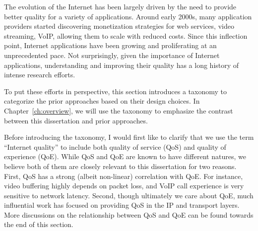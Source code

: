 The evolution of the Internet has been largely driven by the need
to provide better quality for a variety of applications.
Around early 2000s, many application 
providers started discovering monetization strategies for web services, 
video streaming, VoIP, allowing them 
to scale with reduced costs.
Since this inflection point, Internet applications have been 
growing and proliferating at an unprecedented pace.
Not surprisingly, given the importance of Internet applications, 
understanding and improving their quality has a long history of
intense research efforts.

To put these efforts in perspective, this section introduces a taxonomy 
to categorize the prior approaches based on their design choices.
In Chapter~\ref{ch:overview}, we will use the taxonomy to emphasize the 
contrast between this dissertation and prior approaches.

Before introducing the taxonomy, I would first like to clarify that we use
the term ``Internet quality'' to include both quality of service (QoS) and 
quality of experience (QoE).
While QoS and QoE are known to have different natures, we believe both of
them are closely relevant  to this dissertation for two reasons.
First, QoS has a strong (albeit non-linear) correlation with QoE.
For instance, video buffering highly depends on packet loss, and 
VoIP call experience is very sensitive to network latency.
Second, though ultimately we care about QoE, 
much influential work has focused on providing 
QoS in the IP and transport layers.
More discussions on the relationship between QoS and QoE can be 
found towards the end of this section.

